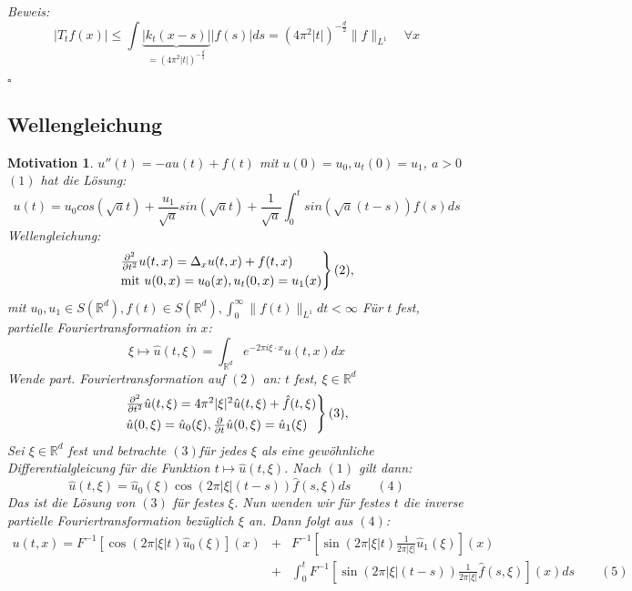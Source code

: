 \documentclass[12pt,a4paper,titlepage]{scrartcl}
\newtheorem{Motivation}[Satz]{Motivation}
\numberwithin{equation}{section}
\newcommand{\R}{\mathbb{R}} %
\newcommand{\Bew}{\emph{Beweis: }}
\newcommand{\laplace}{\Delta}
\newcommand{\qed}{\begin{flushright}
		$\square$
	\end{flushright}}
\begin{document}
	\Bew
		\[ |T_{t}f(x)| \leq \int \underbrace{|k_{t}(x - s)|}_{= (4 \pi^{2} |t|)^{-\frac{d}{2}}} |f(s)| ds = (4 \pi^{2} |t|)^{-\frac{d}{2}} \| f \|_{L^{1}} \quad \forall x \]
	\qed
	
	
	\subsection{Wellengleichung}
	\begin{Motivation}
		$u''(t) = - a u(t) + f(t)$ mit $u(0) = u_{0}, u_{t}(0) = u_{1}$, $a > 0$ $(1)$ hat die Lösung: 
		\[ u(t) = u_{0} cos(\sqrt{a} t) + \frac{u_{1}}{\sqrt{a}} sin(\sqrt{a} t) + \frac{1}{\sqrt{a}} \int_{0}^{t} sin(\sqrt{a} (t-s)) f(s) ds \]
		Wellengleichung: \\
		\[ \begin{rcases}
			\frac{\partial^{2}}{\partial t^{2}} u(t, x) = \laplace_{x} u(t, x) + f(t, x) \\
			\text{mit } u(0, x) = u_{0}(x), u_{t}(0, x) = u_{1}(x)
		\end{rcases} (2), \]
		mit $u_{0}, u_{1} \in S(\R^{d}), f(t) \in S(\R^{d}), \int_{0}^{\infty} \|f(t)\|_{L^{1}} dt < \infty$
		Für $t$ fest, partielle Fouriertransformation in $x$:
		\[ \xi \mapsto \hat{u}(t, \xi) = \int_{\R^{d}} e^{-2\pi i \xi \cdot x} u(t, x) dx \]
		Wende part. Fouriertransformation auf $(2)$ an: $t$ fest, $\xi \in \R^{d}$ \\
		\[ \begin{rcases}
			\frac{\partial^{2}}{\partial t^{2}} \hat{u}(t, \xi) = 4 \pi^{2} |\xi|^{2} \hat{u}(t, \xi) + \hat{f}(t, \xi) \\
			\hat{u}(0, \xi) = \hat{u}_{0}(\xi), \frac{\partial}{\partial t} \hat{u}(0, \xi) = \hat{u}_{1}(\xi)
		\end{rcases} (3), \]
		Sei $\xi \in \R^{d}$ fest und betrachte $(3)$für jedes $\xi$ als eine gewöhnliche Differentialgleicung für die Funktion $t \mapsto \hat{u}(t, \xi)$. Nach $(1)$ gilt dann:
		\[ \hat{u}(t, \xi) = \hat{u}_{0}(\xi) \cos(2 \pi |\xi| (t - s)) \hat{f}(s, \xi) ds \qquad (4) \]
		Das ist die Lösung von $(3)$ für festes $\xi$. Nun wenden wir für festes $t$ die inverse partielle Fouriertransformation bezüglich $\xi$ an. Dann folgt aus $(4)$:
		\begin{eqnarray*}
			u(t, x) = F^{-1} \left[ \cos( 2 \pi |\xi| t ) \hat{u}_{0}(\xi) \right](x) &+& F^{-1} \left[ \sin( 2 \pi |\xi| t ) \frac{1}{2 \pi |\xi| } \hat{u}_{1}(\xi) \right](x) \\
			&+& \int_{0}^{t} F^{-1} \left[ \sin( 2 \pi |\xi| (t-s) ) \frac{1}{2 \pi |\xi|} \hat{f}(s, \xi) \right](x) ds \qquad (5)

\end{eqnarray*}
\end{Motivation}
\end{document}
